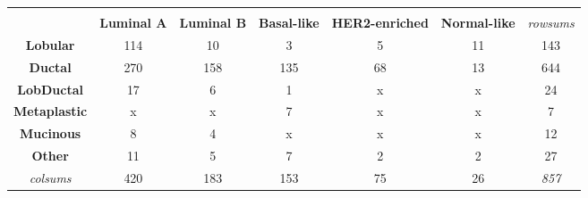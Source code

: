\begin{table}[!h]
{\begin{tabular}{ccccccc}
                \multicolumn{1}{l}{} & \multicolumn{1}{l}{} & \multicolumn{1}{l}{} & \multicolumn{1}{l}{} & \multicolumn{1}{l}{} & \multicolumn{1}{l}{} & \multicolumn{1}{l}{} \\
                \multicolumn{1}{c|}{} & \multicolumn{1}{c|}{\textbf{Luminal A}} & \multicolumn{1}{c|}{\textbf{Luminal B}} & \multicolumn{1}{c|}{\textbf{Basal-like}} & \multicolumn{1}{c|}{\textbf{HER2-enriched}} & \multicolumn{1}{c|}{\textbf{Normal-like}} & {\color[HTML]{9B9B9B} \textit{rowsums}} \\ \hline
                \multicolumn{1}{c|}{\textbf{Lobular}} & \multicolumn{1}{c|}{114} & \multicolumn{1}{c|}{10} & \multicolumn{1}{c|}{3} & \multicolumn{1}{c|}{5} & \multicolumn{1}{c|}{11} & \multicolumn{1}{c|}{{\color[HTML]{656565} 143}} \\ \hline
                \multicolumn{1}{c|}{\textbf{Ductal}} & \multicolumn{1}{c|}{270} & \multicolumn{1}{c|}{158} & \multicolumn{1}{c|}{135} & \multicolumn{1}{c|}{68} & \multicolumn{1}{c|}{13} & \multicolumn{1}{c|}{{\color[HTML]{656565} 644}} \\ \hline
                \multicolumn{1}{c|}{{\color[HTML]{000000} \textbf{LobDuctal}}} & \multicolumn{1}{c|}{17} & \multicolumn{1}{c|}{6} & \multicolumn{1}{c|}{1} & \multicolumn{1}{c|}{{\color[HTML]{C0C0C0} x}} & \multicolumn{1}{c|}{{\color[HTML]{C0C0C0} x}} & \multicolumn{1}{c|}{{\color[HTML]{656565} 24}} \\ \hline
                \multicolumn{1}{c|}{\textbf{Metaplastic}} & \multicolumn{1}{c|}{{\color[HTML]{C0C0C0} x}} & \multicolumn{1}{c|}{{\color[HTML]{C0C0C0} x}} & \multicolumn{1}{c|}{7} & \multicolumn{1}{c|}{{\color[HTML]{C0C0C0} x}} & \multicolumn{1}{c|}{{\color[HTML]{C0C0C0} x}} & \multicolumn{1}{c|}{{\color[HTML]{656565} 7}} \\ \hline
                \multicolumn{1}{c|}{\textbf{Mucinous}} & \multicolumn{1}{c|}{8} & \multicolumn{1}{c|}{4} & \multicolumn{1}{c|}{{\color[HTML]{C0C0C0} x}} & \multicolumn{1}{c|}{{\color[HTML]{C0C0C0} x}} & \multicolumn{1}{c|}{{\color[HTML]{C0C0C0} x}} & \multicolumn{1}{c|}{{\color[HTML]{656565} 12}} \\ \hline
                \multicolumn{1}{c|}{\textbf{Other}} & \multicolumn{1}{c|}{11} & \multicolumn{1}{c|}{5} & \multicolumn{1}{c|}{7} & \multicolumn{1}{c|}{2} & \multicolumn{1}{c|}{2} & \multicolumn{1}{c|}{{\color[HTML]{656565} 27}} \\ \hline
                \multicolumn{1}{c|}{{\color[HTML]{9B9B9B} \textit{colsums}}} & \multicolumn{1}{c|}{{\color[HTML]{656565} 420}} & \multicolumn{1}{c|}{{\color[HTML]{656565} 183}} & \multicolumn{1}{c|}{{\color[HTML]{656565} 153}} & \multicolumn{1}{c|}{{\color[HTML]{656565} 75}} & \multicolumn{1}{c|}{{\color[HTML]{656565} 26}} & \multicolumn{1}{c|}{\textit{857}} \\ \cline{2-7} 

\end{tabular}}
\end{table}
